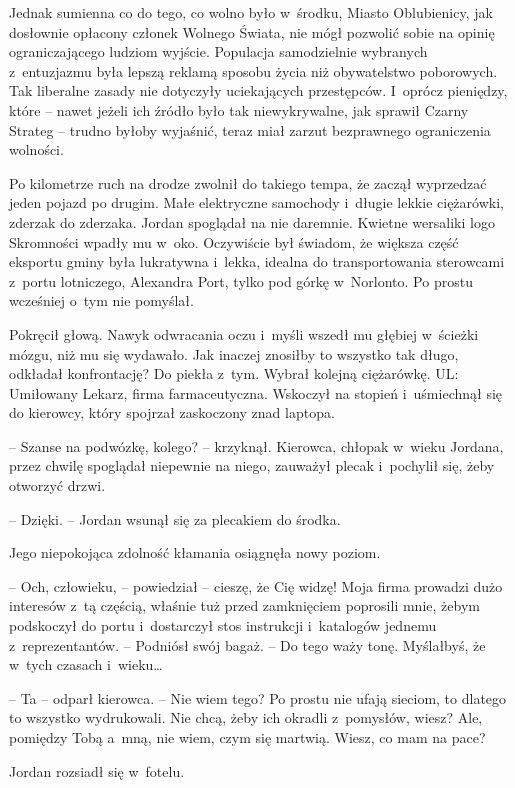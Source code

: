 \documentclass[oneside,polish,11pt,sfheadings]{mwbk}
\begin{document}
Jednak sumienna co do tego, co wolno było w~środku, Miasto Oblubienicy,
jak dosłownie opłacony członek Wolnego Świata, nie mógł pozwolić sobie
na opinię ograniczającego ludziom wyjście. Populacja samodzielnie
wybranych z~entuzjazmu była lepszą reklamą sposobu życia niż
obywatelstwo poborowych. Tak liberalne zasady nie dotyczyły uciekających
przestępców. I~oprócz pieniędzy, które -- nawet jeżeli ich źródło było
tak niewykrywalne, jak sprawił Czarny Strateg -- trudno byłoby wyjaśnić,
teraz miał zarzut bezprawnego ograniczenia wolności.

Po kilometrze ruch na drodze zwolnił do takiego tempa, że zaczął
wyprzedzać jeden pojazd po drugim. Małe elektryczne samochody i~długie
lekkie ciężarówki, zderzak do zderzaka. Jordan spoglądał na nie
daremnie. Kwietne wersaliki logo Skromności wpadły mu w~oko. Oczywiście
był świadom, że większa część eksportu gminy była lukratywna i~lekka,
idealna do transportowania sterowcami z~portu lotniczego, Alexandra
Port, tylko pod górkę w~Norlonto. Po prostu wcześniej o~tym nie
pomyślał.

Pokręcił głową. Nawyk odwracania oczu i~myśli wszedł mu głębiej w~ścieżki mózgu, niż mu się wydawało. Jak inaczej znosiłby to wszystko tak
długo, odkładał konfrontację? Do piekła z~tym. Wybrał kolejną
ciężarówkę. UL: Umiłowany Lekarz, firma farmaceutyczna. Wskoczył na
stopień i~uśmiechnął się do kierowcy, który spojrzał zaskoczony znad
laptopa.

-- Szanse na podwózkę, kolego? -- krzyknął. Kierowca, chłopak w~wieku
Jordana, przez chwilę spoglądał niepewnie na niego, zauważył plecak i~pochylił się, żeby otworzyć drzwi.

-- Dzięki. -- Jordan wsunął się za plecakiem do środka.

Jego niepokojąca zdolność kłamania osiągnęła nowy poziom.

-- Och, człowieku, -- powiedział -- cieszę, że Cię widzę! Moja firma
prowadzi dużo interesów z~tą częścią, właśnie tuż przed zamknięciem
poprosili mnie, żebym podskoczył do portu i~dostarczył stos instrukcji i~katalogów jednemu z~reprezentantów. -- Podniósł swój bagaż. -- Do tego
waży tonę. Myślałbyś, że w~tych czasach i~wieku\ldots

-- Ta -- odparł kierowca. -- Nie wiem tego? Po prostu nie ufają sieciom, to
dlatego to wszystko wydrukowali. Nie chcą, żeby ich okradli z~pomysłów,
wiesz? Ale, pomiędzy Tobą a~mną, nie wiem, czym się martwią. Wiesz, co
mam na pace?

Jordan rozsiadł się w~fotelu. 
\end{document}
